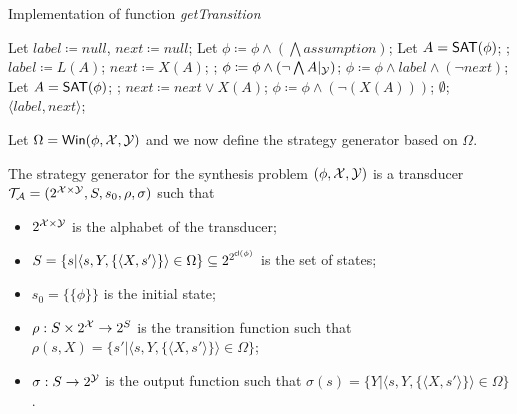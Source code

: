 \begin{algorithm}
\caption{Implementation of function \emph{getTransition}}
	\begin{algorithmic}[1]
	
	\STATE Let $label\coloneqq null$, $next \coloneqq null$;
	\STATE Let $\phi\coloneqq \phi\wedge\left(\bigwedge assumption\right)$;
    	\STATE Let $A = \textsf{SAT} (\phi)$;
    		\BREAK;
    	\ENDIF
        	\STATE $label\coloneqq L(A)$;
        	\STATE $next\coloneqq X(A)$;
        	\BREAK;
    	\ENDIF
    	\STATE $\phi\coloneqq \phi\wedge\left(\neg\bigwedge A|_{\mathcal{Y}}\right)$;
	\ENDWHILE
	\STATE $\phi\coloneqq \phi\wedge label\wedge(\neg next)$;
    	\STATE Let $A = \textsf{SAT}(\phi)$;
    		\BREAK;
    	\ENDIF
    	\STATE $next\coloneqq next\vee X(A)$;
    	\STATE $\phi\coloneqq \phi\wedge(\neg (X(A)))$;
	\ENDWHILE
		\RETURN $\emptyset$;
	\ENDIF
	\RETURN $\langle label,next\rangle$;
	\end{algorithmic}
\end{algorithm}


Let $\Omega = {\sf Win} (\phi, \mathcal{X}, \mathcal{Y})$ and we now define the strategy generator based on $\Omega$. 

\begin{definition}\label{def:transducer}
	The strategy generator for the \ltlf synthesis problem $(\phi, \mathcal{X}, \mathcal{Y})$ is a transducer $\mathcal{T}_{\mathcal{A}}=(2^{\mathcal{X}\times\mathcal{Y}}, S, s_0, \rho, \sigma)$ such that
	\begin{itemize}
		\item $2^{\mathcal{X}\times\mathcal{Y}}$ is the alphabet of the transducer;
		\item $S = \{s| \langle s, Y, \{\langle X, s'\rangle\}\rangle \in\Omega\}\subseteq 2^{2^{{\sf cl}(\phi)}}$ is the set of states;
		\item $s_0 = \{\{\phi\}\}$ is the initial state;
		\item $\rho: S\times 2^{\mathcal{X}}\rightarrow 2^S$ is the transition function such that $\rho (s, X) = \{s' | \langle s, Y, \{\langle X, s'\rangle\}\rangle\in \Omega\}$;
		\item $\sigma: S\rightarrow 2^{\mathcal{Y}}$ is the output function such that $\sigma(s)=\{Y | \langle s, Y, \{\langle X, s'\rangle\}\rangle \in \Omega\}$.
	\end{itemize}
\end{definition}


